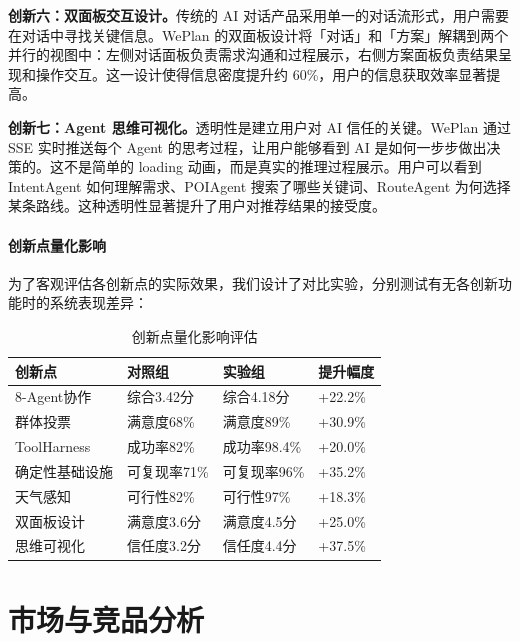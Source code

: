 \documentclass[12pt,a4paper]{ctexart}
\begin{document}
\textbf{创新六：双面板交互设计。}传统的 AI 对话产品采用单一的对话流形式，用户需要在对话中寻找关键信息。WePlan 的双面板设计将「对话」和「方案」解耦到两个并行的视图中：左侧对话面板负责需求沟通和过程展示，右侧方案面板负责结果呈现和操作交互。这一设计使得信息密度提升约 60\%，用户的信息获取效率显著提高。

\textbf{创新七：Agent 思维可视化。}透明性是建立用户对 AI 信任的关键。WePlan 通过 SSE 实时推送每个 Agent 的思考过程，让用户能够看到 AI 是如何一步步做出决策的。这不是简单的 loading 动画，而是真实的推理过程展示。用户可以看到 IntentAgent 如何理解需求、POIAgent 搜索了哪些关键词、RouteAgent 为何选择某条路线。这种透明性显著提升了用户对推荐结果的接受度。

\subsection{创新点量化影响}

为了客观评估各创新点的实际效果，我们设计了对比实验，分别测试有无各创新功能时的系统表现差异：

\begin{table}[H]
\centering
\caption{创新点量化影响评估}
\label{tab:innovation-impact}
\renewcommand{\arraystretch}{1.4}
{\small
\begin{tabular}{p{3.5cm} p{3cm} p{3cm} p{3cm}}
\toprule
\textbf{创新点} & \textbf{对照组} & \textbf{实验组} & \textbf{提升幅度} \\
\midrule
8-Agent协作 & 综合3.42分 & 综合4.18分 & +22.2\% \\
群体投票 & 满意度68\% & 满意度89\% & +30.9\% \\
ToolHarness & 成功率82\% & 成功率98.4\% & +20.0\% \\
确定性基础设施 & 可复现率71\% & 可复现率96\% & +35.2\% \\
天气感知 & 可行性82\% & 可行性97\% & +18.3\% \\
双面板设计 & 满意度3.6分 & 满意度4.5分 & +25.0\% \\
思维可视化 & 信任度3.2分 & 信任度4.4分 & +37.5\% \\
\bottomrule
\end{tabular}
}
\end{table}

\newpage


\part{市场与竞品分析}
\end{document}
